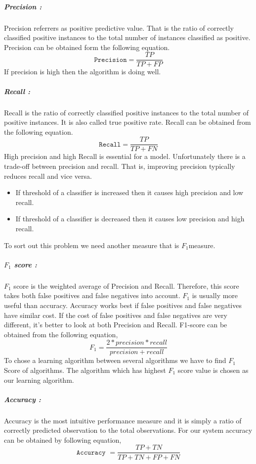 \documentclass[12pt,a4paper]{report}
\begin{document}
\subparagraph{Precision :}
Precision referrers as positive predictive value. That is the ratio of
correctly classified positive instances to the total number of instances classified as positive. Precision can be obtained form  the following equation.
\begin{equation}
    \texttt{Precision} = \frac{TP}{TP+FP}
\end{equation}
If precision is high then the algorithm is doing well.

\subparagraph{Recall :}
Recall is the ratio of correctly classified positive instances to the total number of positive instances. It is also called true positive rate. Recall can be obtained from the following equation.
\begin{equation}
    \texttt{Recall} = \frac{TP}{TP+FN}
\end{equation}
High precision and high Recall is essential for a model. Unfortunately there is a trade-off between precision and recall. That is, improving precision typically reduces recall and vice versa. 
\begin{itemize}
    \item If threshold of a classifier is increased then it causes high precision and low recall.
    \item If threshold of a classifier is decreased then it causes low precision and high recall.
\end{itemize}
To sort out this problem we need another measure that is $F_1$measure.

\subparagraph{$F_1$ score :}
 $F_1$ score is the weighted average of Precision and Recall. Therefore, this score takes both false positives and false negatives into account. $F_1$ is usually more useful than accuracy. Accuracy works best if false positives and false negatives have similar cost. If the cost of false positives and false negatives are very different, it’s better to look at both Precision and Recall. F1-score can be obtained from the following equation,
 \begin{equation}
     F_1 = \frac{2*precision*recall}{precision+recall}
 \end{equation}
To chose a learning algorithm between several algorithms we have to find $F_1$ Score of algorithms. The algorithm which has highest $F_1$ score value is chosen as our learning algorithm.

\subparagraph{Accuracy :}
 Accuracy is the most intuitive performance measure and it is simply a ratio of correctly predicted observation to the total observations. For our system accuracy can be obtained by following equation,
\begin{equation}
    \texttt{Accuracy } = \frac{TP+TN}{TP+TN+FP+FN}
\end{equation}
\end{document}
